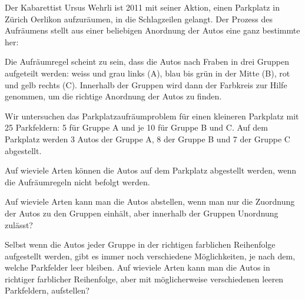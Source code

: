 Der Kabarettist Ursus Wehrli ist 2011 mit seiner Aktion,
einen Parkplatz in Zürich Oerlikon aufzuräumen, in die Schlagzeilen
gelangt.
Der Prozess des Aufräumens stellt aus einer beliebigen Anordnung der
Autos eine ganz bestimmte her:
\begin{center}
\end{center}
Die Aufräumregel scheint zu sein, dass die Autos nach Fraben in drei Gruppen
aufgeteilt werden: weiss und grau links (A),
blau bis grün in der Mitte (B), rot und gelb rechts (C). Innerhalb der Gruppen
wird dann der Farbkreis zur Hilfe genommen, um die richtige Anordnung
der Autos zu finden.

Wir untersuchen das Parkplatzaufräumproblem für einen kleineren
Parkplatz mit 25 Parkfeldern: 5 für Gruppe A und je 10 für Gruppe B und C.
Auf dem Parkplatz werden 3 Autos der Gruppe A, 8 der Gruppe B und 7 der
Gruppe C abgestellt.
\begin{teilaufgaben}
\item Auf wieviele Arten können die Autos auf dem Parkplatz abgestellt
werden, wenn die Aufräumregeln nicht befolgt werden.
\item Auf wieviele Arten kann man die Autos abstellen, wenn man nur
die Zuordnung der Autos zu den Gruppen einhält, aber innerhalb 
der Gruppen Unordnung zulässt?
\item Selbst wenn die Autos jeder Gruppe in der richtigen farblichen
Reihenfolge aufgestellt werden, gibt es immer noch verschiedene
Möglichkeiten, je nach dem, welche Parkfelder leer bleiben. Auf
wieviele Arten kann man die Autos in richtiger farblicher Reihenfolge,
aber mit möglicherweise verschiedenen leeren Parkfeldern, aufstellen?
\end{teilaufgaben}


